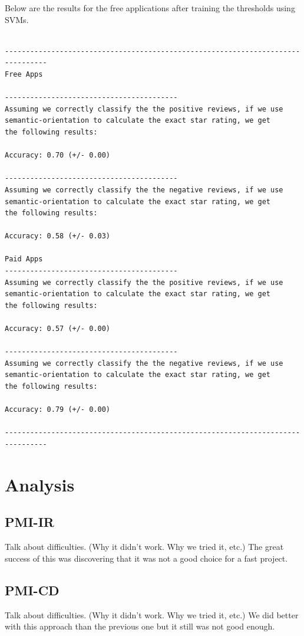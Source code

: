 \documentclass[11pt]{report} %
\begin{document}
Below are the results for the free applications after training the thresholds using SVMs.

\begin{verbatim}

--------------------------------------------------------------------------------
Free Apps

-----------------------------------------
Assuming we correctly classify the the positive reviews, if we use 
semantic-orientation to calculate the exact star rating, we get 
the following results:

Accuracy: 0.70 (+/- 0.00)

-----------------------------------------
Assuming we correctly classify the the negative reviews, if we use 
semantic-orientation to calculate the exact star rating, we get 
the following results:

Accuracy: 0.58 (+/- 0.03)

Paid Apps
-----------------------------------------
Assuming we correctly classify the the positive reviews, if we use 
semantic-orientation to calculate the exact star rating, we get 
the following results:

Accuracy: 0.57 (+/- 0.00)

-----------------------------------------
Assuming we correctly classify the the negative reviews, if we use 
semantic-orientation to calculate the exact star rating, we get 
the following results:

Accuracy: 0.79 (+/- 0.00)

--------------------------------------------------------------------------------
\end{verbatim}

\chapter{Analysis}
	\section{PMI-IR}

Talk about difficulties. (Why it didn't work. Why we tried it, etc.)
The great success of this was discovering that it was not a good choice for a fast
project.

	\section{PMI-CD}

Talk about difficulties. (Why it didn't work. Why we tried it, etc.)
We did better with this approach than the previous one but it still was not good enough.
\end{document}
